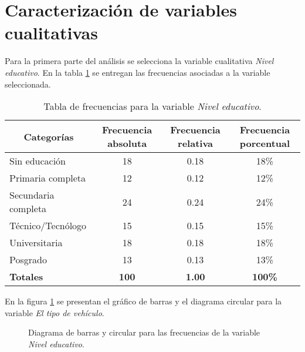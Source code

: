 \section*{Caracterización de variables cualitativas}
Para la primera parte del análisis se selecciona la variable cualitativa \emph{Nivel educativo}. En la tabla \ref{tab:tablaFrecuentasVariableCualitativa} se entregan las frecuencias asociadas a la variable seleccionada.\par
\begin{table}[!htbp]
    \begin{footnotesize}
    \centering
    \begin{tabular}{lccc}
        \toprule
        \multicolumn{1}{c}{\textbf{Categorías}} & \multicolumn{1}{c}{\textbf{Frecuencia absoluta}} & \multicolumn{1}{c}{\textbf{Frecuencia relativa}} & \multicolumn{1}{c}{\textbf{Frecuencia porcentual}}\\
        \midrule
        Sin educación & 18 & 0.18 & 18\% \\
        \midrule
        Primaria completa & 12 & 0.12 & 12\% \\
        \midrule
        Secundaria completa & 24 & 0.24 & 24\% \\
        \midrule
        Técnico/Tecnólogo & 15 & 0.15 & 15\% \\
        \midrule
        Universitaria & 18 & 0.18 & 18\% \\
        \midrule
        Posgrado & 13 & 0.13 & 13\% \\
        \toprule
        \rowcolor{myGray}
        \textbf{Totales} & \textbf{100} & \textbf{1.00} & \textbf{100\%} \\
        \bottomrule
    \end{tabular}
    \caption{\footnotesize{Tabla de frecuencias para la variable \emph{Nivel educativo}.}}
    \label{tab:tablaFrecuentasVariableCualitativa}
    \end{footnotesize}
\end{table}
En la figura \ref{fig:graficasVariableCualitativa} se presentan el gráfico de barras y el diagrama circular para la variable \emph{El tipo de vehículo}.\par
\vspace{1em}
\begin{figure}[!ht]
    \centering
    \noindent\parbox[][][c]{.55\linewidth}{
        
    }
    \parbox[][][c]{.4\linewidth}{
        
    }\par
    \caption{\footnotesize{Diagrama de barras y circular para las frecuencias de la variable \emph{Nivel educativo}.}}
    \label{fig:graficasVariableCualitativa}
\end{figure}
